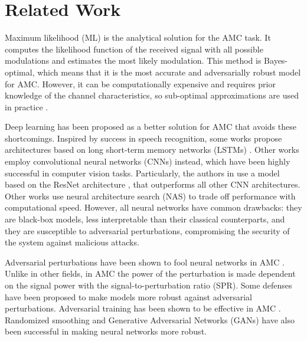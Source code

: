 \documentclass[conference]{IEEEtran}
\begin{document}
\section{Related Work}

Maximum likelihood (ML) \cite{huan1995likelihood,dobre2007survey,hameed2009likelihood} is the analytical solution for the AMC task. It computes the likelihood function of the received signal with all possible modulations and estimates the most likely modulation. This method is Bayes-optimal, which means that it is the most accurate and adversarially robust model for AMC. However, it can be computationally expensive and requires prior knowledge of the channel characteristics, so sub-optimal approximations are used in practice \cite{dobre2007survey,Hameed_Dobre_Popescu_2009}.

Deep learning \cite{goodfellow2016deep} has been proposed as a better solution for AMC that avoids these shortcomings. Inspired by success in speech recognition, some works \cite{Rajendran_Meert_Giustiniano_Lenders_Pollin_2018,Guo_Jiang_Wu_Zhou_2020} propose architectures based on long short-term memory networks (LSTMs) \cite{Hochreiter_Schmidhuber_1997}. Other works \cite{OShea_Corgan_Clancy_2016,West_OShea_2017,Sadeghi_Larsson_2019} employ convolutional neural networks (CNNs) \cite{Krizhevsky_Sutskever_Hinton_2017} instead, which have been highly successful in computer vision tasks. Particularly, the authors in \cite{OShea_Roy_Clancy_2018} use a model based on the ResNet architecture \cite{Szegedy_Ioffe_Vanhoucke_Alemi_2016}, that outperforms all other CNN architectures. Other works use neural architecture search (NAS) \cite{ahmadi2008modulation,dai2019multi,perenda2021evolutionary} to trade off performance with computational speed. However, all neural networks have common drawbacks: they are black-box models, less interpretable than their classical counterparts, and they are susceptible to adversarial perturbations, compromising the security of the system against malicious attacks.

Adversarial perturbations have been shown to fool neural networks in AMC \cite{Sadeghi_Larsson_2019,maroto2021benefits}. Unlike in other fields, in AMC the power of the perturbation is made dependent on the signal power with the signal-to-perturbation ratio (SPR). Some defenses have been proposed to make models more robust against adversarial perturbations. Adversarial training \cite{Madry_Makelov_Schmidt_Tsipras_Vladu_2019} has been shown to be effective in AMC \cite{maroto2021safeamc,manoj2022toward}. Randomized smoothing \cite{kim2021channel,manoj2022toward} and Generative Adversarial Networks (GANs) \cite{wang2022gan} have also been successful in making neural networks more robust.
\end{document}
